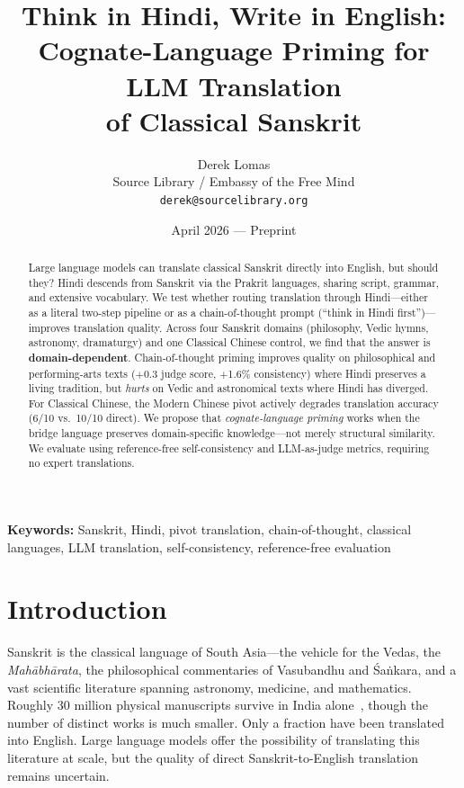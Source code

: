 \documentclass[10pt,twocolumn]{article}
\title{\Large\bfseries Think in Hindi, Write in English:\\[4pt] Cognate-Language Priming for LLM Translation\\of Classical Sanskrit}
\author{Derek Lomas\\
\small Source Library / Embassy of the Free Mind\\
\small \texttt{derek@sourcelibrary.org}}
\date{April 2026 --- Preprint}
\newcommand{\keywords}[1]{\par\smallskip\noindent\textbf{Keywords:} #1}
\begin{document}
\maketitle
\thispagestyle{empty}

\begin{abstract}
\noindent Large language models can translate classical Sanskrit directly into English, but should they? Hindi descends from Sanskrit via the Prakrit languages, sharing script, grammar, and extensive vocabulary. We test whether routing translation through Hindi---either as a literal two-step pipeline or as a chain-of-thought prompt (``think in Hindi first'')---improves translation quality. Across four Sanskrit domains (philosophy, Vedic hymns, astronomy, dramaturgy) and one Classical Chinese control, we find that the answer is \textbf{domain-dependent}. Chain-of-thought priming improves quality on philosophical and performing-arts texts ($+$0.3 judge score, $+$1.6\% consistency) where Hindi preserves a living tradition, but \emph{hurts} on Vedic and astronomical texts where Hindi has diverged. For Classical Chinese, the Modern Chinese pivot actively degrades translation accuracy (6/10 vs.\ 10/10 direct). We propose that \emph{cognate-language priming} works when the bridge language preserves domain-specific knowledge---not merely structural similarity. We evaluate using reference-free self-consistency and LLM-as-judge metrics, requiring no expert translations.
\end{abstract}

\keywords{Sanskrit, Hindi, pivot translation, chain-of-thought, classical languages, LLM translation, self-consistency, reference-free evaluation}

\section{Introduction}

Sanskrit is the classical language of South Asia---the vehicle for the Vedas, the \emph{Mah\=abh\=arata}, the philosophical commentaries of Vasubandhu and \'Sa\.nkara, and a vast scientific literature spanning astronomy, medicine, and mathematics. Roughly 30 million physical manuscripts survive in India alone~\cite{pollock2006}, though the number of distinct works is much smaller. Only a fraction have been translated into English. Large language models offer the possibility of translating this literature at scale, but the quality of direct Sanskrit-to-English translation remains uncertain.
\end{document}
